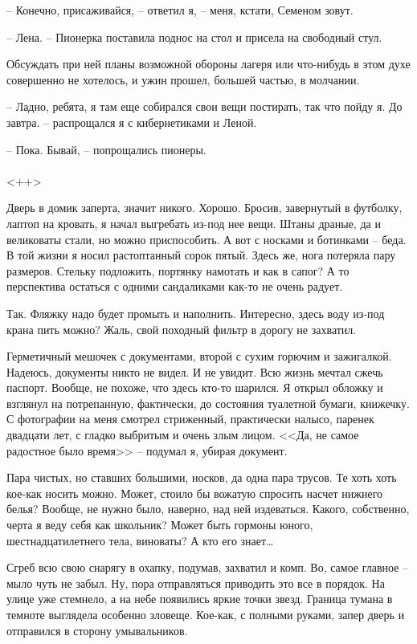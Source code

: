 \documentclass[a4paper]{book}
\begin{document}
-- Конечно, присаживайся, -- ответил я, -- меня, кстати, Семеном зовут.

-- Лена. -- Пионерка поставила поднос на стол и присела на свободный стул. 

Обсуждать при ней планы возможной обороны лагеря или что-нибудь в этом духе совершенно не хотелось, и ужин прошел, большей частью, в молчании.

-- Ладно, ребята, я там еще собирался свои вещи постирать, так что пойду я. До завтра. -- распрощался я с кибернетиками и Леной.

-- Пока. Бывай, -- попрощались пионеры.

\paragraph{}<++>

Дверь в домик заперта, значит никого. Хорошо. Бросив, завернутый в футболку, лаптоп на кровать, я начал выгребать из-под нее вещи. Штаны драные, да и великоваты стали, но можно приспособить. А вот с носками и ботинками -- беда. В той жизни я носил растоптанный сорок пятый. Здесь же, нога потеряла пару размеров. Стельку подложить, портянку намотать и как в сапог? А то перспектива остаться с одними сандаликами как-то не очень радует.

Так. Фляжку надо будет промыть и наполнить. Интересно, здесь воду из-под крана пить можно? Жаль, свой походный фильтр в дорогу не захватил.

Герметичный мешочек с документами, второй с сухим горючим и зажигалкой. Надеюсь, документы никто не видел. И не увидит. Всю жизнь мечтал сжечь паспорт. Вообще, не похоже, что здесь кто-то шарился. Я открыл обложку и взглянул на потрепанную, фактически, до состояния туалетной бумаги, книжечку. С фотографии на меня смотрел стриженный, практически налысо, паренек двадцати лет, с гладко выбритым и очень злым лицом.  <<Да, не самое радостное было время>> -- подумал я, убирая документ.


Пара чистых, но ставших большими, носков, да одна пара трусов. Те хоть хоть кое-как носить можно. Может, стоило бы вожатую спросить насчет нижнего белья? Вообще, не нужно было, наверно, над ней издеваться. Какого, собственно, черта я веду себя как школьник? Может быть гормоны юного, шестнадцатилетнего тела, виноваты? А кто его знает\ldots

Сгреб всю свою снарягу в охапку, подумав, захватил и комп. Во, самое главное -- мыло чуть не забыл. Ну, пора отправляться  приводить это все в порядок. На улице уже стемнело, а на небе появились яркие точки звезд. Граница тумана в темноте выглядела особенно зловеще. Кое-как, с полными руками, запер дверь и отправился в сторону умывальников.
\end{document}
